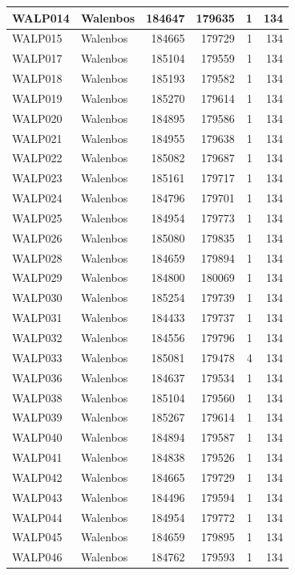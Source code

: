 \documentclass[11pt,]{book}
\begin{document}
\begin{table}
\begin{tabular}[t]{l|l|r|r|r|r}
\hline
WALP014 & Walenbos & 184647 & 179635 & 1 & 134\\
\hline
WALP015 & Walenbos & 184665 & 179729 & 1 & 134\\
\hline
WALP017 & Walenbos & 185104 & 179559 & 1 & 134\\
\hline
WALP018 & Walenbos & 185193 & 179582 & 1 & 134\\
\hline
WALP019 & Walenbos & 185270 & 179614 & 1 & 134\\
\hline
WALP020 & Walenbos & 184895 & 179586 & 1 & 134\\
\hline
WALP021 & Walenbos & 184955 & 179638 & 1 & 134\\
\hline
WALP022 & Walenbos & 185082 & 179687 & 1 & 134\\
\hline
WALP023 & Walenbos & 185161 & 179717 & 1 & 134\\
\hline
WALP024 & Walenbos & 184796 & 179701 & 1 & 134\\
\hline
WALP025 & Walenbos & 184954 & 179773 & 1 & 134\\
\hline
WALP026 & Walenbos & 185080 & 179835 & 1 & 134\\
\hline
WALP028 & Walenbos & 184659 & 179894 & 1 & 134\\
\hline
WALP029 & Walenbos & 184800 & 180069 & 1 & 134\\
\hline
WALP030 & Walenbos & 185254 & 179739 & 1 & 134\\
\hline
WALP031 & Walenbos & 184433 & 179737 & 1 & 134\\
\hline
WALP032 & Walenbos & 184556 & 179796 & 1 & 134\\
\hline
WALP033 & Walenbos & 185081 & 179478 & 4 & 134\\
\hline
WALP036 & Walenbos & 184637 & 179534 & 1 & 134\\
\hline
WALP038 & Walenbos & 185104 & 179560 & 1 & 134\\
\hline
WALP039 & Walenbos & 185267 & 179614 & 1 & 134\\
\hline
WALP040 & Walenbos & 184894 & 179587 & 1 & 134\\
\hline
WALP041 & Walenbos & 184838 & 179526 & 1 & 134\\
\hline
WALP042 & Walenbos & 184665 & 179729 & 1 & 134\\
\hline
WALP043 & Walenbos & 184496 & 179594 & 1 & 134\\
\hline
WALP044 & Walenbos & 184954 & 179772 & 1 & 134\\
\hline
WALP045 & Walenbos & 184659 & 179895 & 1 & 134\\
\hline
WALP046 & Walenbos & 184762 & 179593 & 1 & 134\\

\end{tabular}
\end{table}
\end{document}
